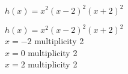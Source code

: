 {$h(x) = x^2(x-2)^2(x+2)^2$
}
{ $h(x) = x^2(x-2)^2(x+2)^2$\\
$x = -2$ multiplicity 2\\
$x = 0$ multiplicity 2\\
$x = 2$ multiplicity 2

\begin{center}
\end{center}}
